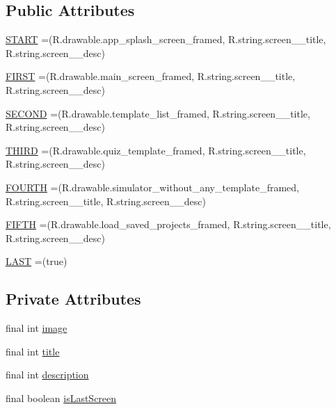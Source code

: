 \subsection*{Public Attributes}
\begin{DoxyCompactItemize}
\item 
\hyperlink{enumorg_1_1buildmlearn_1_1toolkit_1_1model_1_1Tutorial_a6c371c9b15a236ef851b34eb9b0ffefe}{S\+T\+A\+RT} =(R.\+drawable.\+app\+\_\+splash\+\_\+screen\+\_\+framed, R.\+string.\+screen\+\_\+\_\+title, R.\+string.\+screen\+\_\+\_\+desc)
\item 
\hyperlink{enumorg_1_1buildmlearn_1_1toolkit_1_1model_1_1Tutorial_a3b1a4ca35bbdcc35c2d6d7a1c2e87c2a}{F\+I\+R\+ST} =(R.\+drawable.\+main\+\_\+screen\+\_\+framed, R.\+string.\+screen\+\_\+\_\+title, R.\+string.\+screen\+\_\+\_\+desc)
\item 
\hyperlink{enumorg_1_1buildmlearn_1_1toolkit_1_1model_1_1Tutorial_a9854ee2b58dff29ba4addee78e4cdb15}{S\+E\+C\+O\+ND} =(R.\+drawable.\+template\+\_\+list\+\_\+framed, R.\+string.\+screen\+\_\+\_\+title, R.\+string.\+screen\+\_\+\_\+desc)
\item 
\hyperlink{enumorg_1_1buildmlearn_1_1toolkit_1_1model_1_1Tutorial_a9cc74bacb34a8d3a0c7fa0dbadfc0786}{T\+H\+I\+RD} =(R.\+drawable.\+quiz\+\_\+template\+\_\+framed, R.\+string.\+screen\+\_\+\_\+title, R.\+string.\+screen\+\_\+\_\+desc)
\item 
\hyperlink{enumorg_1_1buildmlearn_1_1toolkit_1_1model_1_1Tutorial_ae4478d769431a5f34a6698ca0712ff8f}{F\+O\+U\+R\+TH} =(R.\+drawable.\+simulator\+\_\+without\+\_\+any\+\_\+template\+\_\+framed, R.\+string.\+screen\+\_\+\_\+title, R.\+string.\+screen\+\_\+\_\+desc)
\item 
\hyperlink{enumorg_1_1buildmlearn_1_1toolkit_1_1model_1_1Tutorial_abdd038e81834331bf33408c731685847}{F\+I\+F\+TH} =(R.\+drawable.\+load\+\_\+saved\+\_\+projects\+\_\+framed, R.\+string.\+screen\+\_\+\_\+title, R.\+string.\+screen\+\_\+\_\+desc)
\item 
\hyperlink{enumorg_1_1buildmlearn_1_1toolkit_1_1model_1_1Tutorial_a911e6c620d9108703ad2317efdc3b659}{L\+A\+ST} =(true)
\end{DoxyCompactItemize}
\subsection*{Private Attributes}
\begin{DoxyCompactItemize}
\item 
final int \hyperlink{enumorg_1_1buildmlearn_1_1toolkit_1_1model_1_1Tutorial_adb9c70865c52a85ec9b4149cb61f84e7}{image}
\item 
final int \hyperlink{enumorg_1_1buildmlearn_1_1toolkit_1_1model_1_1Tutorial_a6cd2b7c4e1b8b48f0d7eccdc13b57d09}{title}
\item 
final int \hyperlink{enumorg_1_1buildmlearn_1_1toolkit_1_1model_1_1Tutorial_ac12a03d6552952f23bd952d50f2d227d}{description}
\item 
final boolean \hyperlink{enumorg_1_1buildmlearn_1_1toolkit_1_1model_1_1Tutorial_aa471a8182eb2c792a3764385fbd71cb7}{is\+Last\+Screen}
\end{DoxyCompactItemize}


